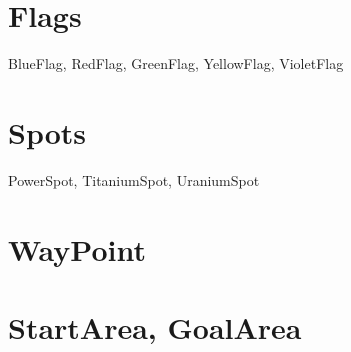 \section{Flags}
BlueFlag, RedFlag, GreenFlag, YellowFlag, VioletFlag
\section{Spots}
PowerSpot, TitaniumSpot, UraniumSpot
\section{WayPoint}
\section{StartArea, GoalArea}